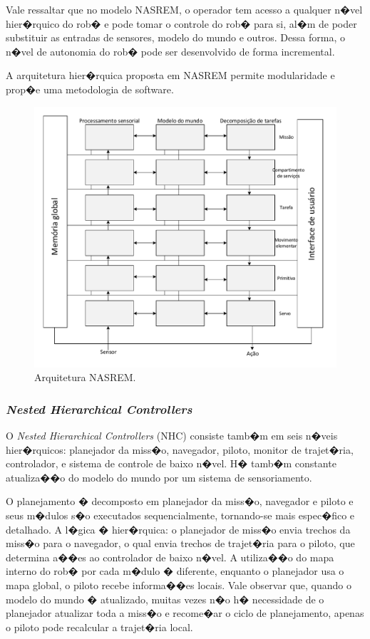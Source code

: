 Vale ressaltar que no modelo NASREM, o operador tem acesso a qualquer n�vel
hier�rquico do rob� e pode tomar o controle do rob� para si, al�m de poder
substituir as entradas de sensores, modelo do mundo e outros. Dessa forma, o
n�vel de autonomia do rob� pode ser desenvolvido de forma incremental.

A arquitetura hier�rquica proposta em NASREM permite modularidade e prop�e uma
metodologia de software.  
 
\begin{figure}[H]
\centering
\includegraphics[width=1\columnwidth]{figs/NASREM.pdf}
\caption{Arquitetura NASREM.}
\label{nasrem}
\end{figure}

\subsubsection{\textit{Nested Hierarchical Controllers}}
O \textit{Nested Hierarchical Controllers} (NHC) consiste tamb�m em seis
n�veis hier�rquicos: planejador da miss�o, navegador, piloto, monitor de
trajet�ria, controlador, e sistema de controle de baixo n�vel. H� tamb�m
constante atualiza��o do modelo do mundo por um sistema de sensoriamento.

O planejamento � decomposto em planejador da miss�o, navegador e piloto e seus
m�dulos s�o executados sequencialmente, tornando-se mais espec�fico e detalhado.
A l�gica � hier�rquica: o planejador de miss�o envia trechos da miss�o para o
navegador, o qual envia trechos de trajet�ria para o piloto, que determina a��es
ao controlador de baixo n�vel. A utiliza��o do mapa interno do rob� por cada
m�dulo � diferente, enquanto o planejador usa o mapa global, o piloto recebe
informa��es locais. Vale observar que, quando o modelo do mundo � atualizado,
muitas vezes n�o h� necessidade de o planejador atualizar toda a miss�o e
recome�ar o ciclo de planejamento, apenas o piloto pode recalcular a trajet�ria
local. 

